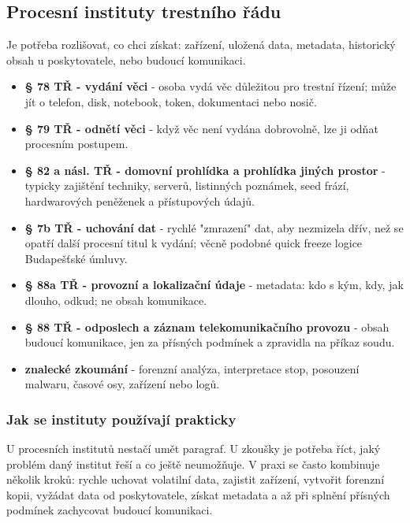 \subsection*{Procesní instituty trestního řádu}
Je potřeba rozlišovat, co chci získat: zařízení, uložená data, metadata, historický obsah u poskytovatele, nebo budoucí komunikaci.
\begin{itemize}
  \item \textbf{§ 78 TŘ - vydání věci} - osoba vydá věc důležitou pro trestní řízení; může jít o telefon, disk, notebook, token, dokumentaci nebo nosič.
  \item \textbf{§ 79 TŘ - odnětí věci} - když věc není vydána dobrovolně, lze ji odňat procesním postupem.
  \item \textbf{§ 82 a násl. TŘ - domovní prohlídka a prohlídka jiných prostor} - typicky zajištění techniky, serverů, listinných poznámek, seed frází, hardwarových peněženek a přístupových údajů.
  \item \textbf{§ 7b TŘ - uchování dat} - rychlé "zmrazení" dat, aby nezmizela dřív, než se opatří další procesní titul k vydání; věcně podobné quick freeze logice Budapešťské úmluvy.
  \item \textbf{§ 88a TŘ - provozní a lokalizační údaje} - metadata: kdo s kým, kdy, jak dlouho, odkud; ne obsah komunikace.
  \item \textbf{§ 88 TŘ - odposlech a záznam telekomunikačního provozu} - obsah budoucí komunikace, jen za přísných podmínek a zpravidla na příkaz soudu.
  \item \textbf{znalecké zkoumání} - forenzní analýza, interpretace stop, posouzení malwaru, časové osy, zařízení nebo logů.
\end{itemize}

\subsubsection*{Jak se instituty používají prakticky}
U procesních institutů nestačí umět paragraf. U zkoušky je potřeba říct, jaký problém daný institut řeší a co ještě neumožňuje. V praxi se často kombinuje několik kroků: rychle uchovat volatilní data, zajistit zařízení, vytvořit forenzní kopii, vyžádat data od poskytovatele, získat metadata a až při splnění přísných podmínek zachycovat budoucí komunikaci.


